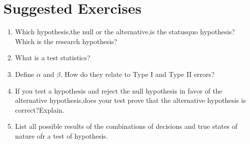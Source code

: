 \documentclass[12pt]{article}
\begin{document}
\fi
\section{Suggested Exercises}\label{ssec.se3}
\begin{enumerate}
\item Which hypothesis,the null or the alternative,is the statusquo hypothesis?Which is the research hypothesis?
\item What is a test statistics?
\item Define $\alpha$ and  $\beta$. How do they relate to Type I and Type II errors?
\item If you test a hypothesis and reject the null hypothesis in favor of the alternative hypothesis,does your test prove that the alternative hypothesis is correct?Explain.
\item List all possible results of the combinations of decisions and true states of nature ofr a test of hypothesis.
\end{enumerate}
\end{document}
